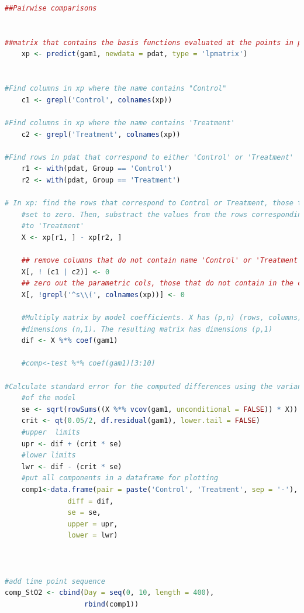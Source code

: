 \documentclass[
]{article}
\begin{document}
\begin{lstlisting}[language=R]
##Pairwise comparisons


##matrix that contains the basis functions evaluated at the points in pdat
    xp <- predict(gam1, newdata = pdat, type = 'lpmatrix')

    
#Find columns in xp where the name contains "Control"
    c1 <- grepl('Control', colnames(xp))

#Find columns in xp where the name contains 'Treatment'
    c2 <- grepl('Treatment', colnames(xp))

#Find rows in pdat that correspond to either 'Control' or 'Treatment'
    r1 <- with(pdat, Group == 'Control')
    r2 <- with(pdat, Group == 'Treatment')

# In xp: find the rows that correspond to Control or Treatment, those that do not match will be
    #set to zero. Then, substract the values from the rows corresponding to 'Control' from those that correspond
    #to 'Treatment'
    X <- xp[r1, ] - xp[r2, ]

    ## remove columns that do not contain name 'Control' or 'Treatment'
    X[, ! (c1 | c2)] <- 0
    ## zero out the parametric cols, those that do not contain in the characters 's('
    X[, !grepl('^s\\(', colnames(xp))] <- 0

    #Multiply matrix by model coefficients. X has (p,n) (rows, columns) and the coefficient matrix has
    #dimensions (n,1). The resulting matrix has dimensions (p,1)
    dif <- X %*% coef(gam1)

    #comp<-test %*% coef(gam1)[3:10]

#Calculate standard error for the computed differences using the variance-covariance matrix
    #of the model
    se <- sqrt(rowSums((X %*% vcov(gam1, unconditional = FALSE)) * X))
    crit <- qt(0.05/2, df.residual(gam1), lower.tail = FALSE)
    #upper  limits
    upr <- dif + (crit * se)
    #lower limits
    lwr <- dif - (crit * se)
    #put all components in a dataframe for plotting
    comp1<-data.frame(pair = paste('Control', 'Treatment', sep = '-'),
               diff = dif,
               se = se,
               upper = upr,
               lower = lwr)



#add time point sequence
comp_StO2 <- cbind(Day = seq(0, 10, length = 400),
                   rbind(comp1))


\end{lstlisting}
\end{document}

